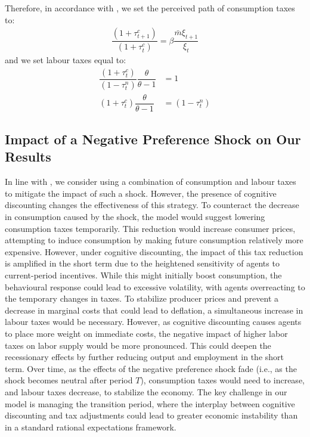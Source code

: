 \documentclass[11pt]{article}
\newcommand{\bb}{\bigbreak\noindent}
\begin{document}
\begin{spacing}{2}
\bb
Therefore, in accordance with \cite{correia2013unconventional}, we set the perceived path of consumption taxes to: 
\begin{align}
	\dfrac{(1+\tau_{t+1}^c)}{(1+\tau_{t}^c)} = \beta \dfrac{\bar{m}\xi_{t+1}}{\xi_t}
\end{align}
and we set labour taxes equal to:
\begin{align}
	\dfrac{(1+\tau_{t}^c)}{(1-\tau_{t}^n)} \dfrac{\theta}{\theta-1} &= 1\\
	(1+\tau_{t}^c)\dfrac{\theta}{\theta-1} &= (1-\tau_{t}^n)
\end{align}



\subsection{Impact of a Negative Preference Shock on Our Results}
In line with \cite{correia2013unconventional}, we consider using a combination of consumption and labour taxes to mitigate the impact of such a shock. However, the presence of cognitive discounting changes the effectiveness of this strategy.
To counteract the decrease in consumption caused by the shock, the model would suggest lowering consumption taxes temporarily. This reduction would increase consumer prices, attempting to induce consumption by making future consumption relatively more expensive. However, under cognitive discounting, the impact of this tax reduction is amplified in the short term due to the heightened sensitivity of agents to current-period incentives. While this might initially boost consumption, the behavioural response could lead to excessive volatility, with agents overreacting to the temporary changes in taxes. To stabilize producer prices and prevent a decrease in marginal costs that could lead to deflation, a simultaneous increase in labour taxes would be necessary. However, as cognitive discounting causes agents to place more weight on immediate costs, the negative impact of higher labor taxes on labor supply would be more pronounced. This could deepen the recessionary effects by further reducing output and employment in the short term.
Over time, as the effects of the negative preference shock fade (i.e., as the shock becomes neutral after period \( T \)), consumption taxes would need to increase, and labour taxes decrease, to stabilize the economy. The key challenge in our model is managing the transition period, where the interplay between cognitive discounting and tax adjustments could lead to greater economic instability than in a standard rational expectations framework.

\end{spacing}
\end{document}
